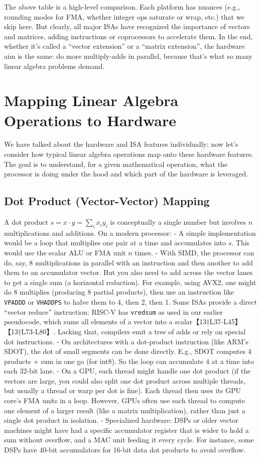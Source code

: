 The above table is a high-level comparison. Each platform has nuances (e.g., rounding modes for FMA, whether integer ops saturate or wrap, etc.) that we skip here. But clearly, all major ISAs have recognized the importance of vectors and matrices, adding instructions or coprocessors to accelerate them. In the end, whether it’s called a “vector extension” or a “matrix extension”, the hardware aim is the same: do more multiply-adds in parallel, because that’s what so many linear algebra problems demand.

\section{Mapping Linear Algebra Operations to Hardware}  
We have talked about the hardware and ISA features individually; now let’s consider how typical linear algebra operations map onto these hardware features. The goal is to understand, for a given mathematical operation, what the processor is doing under the hood and which part of the hardware is leveraged.

\subsection{Dot Product (Vector-Vector) Mapping}  
A dot product $s = x\cdot y = \sum_i x_i y_i$ is conceptually a single number but involves $n$ multiplications and additions. On a modern processor:
- A simple implementation would be a loop that multiplies one pair at a time and accumulates into $s$. This would use the scalar ALU or FMA unit $n$ times.
- With SIMD, the processor can do, say, 8 multiplications in parallel with an instruction and then another to add them to an accumulator vector. But you also need to add across the vector lanes to get a single sum (a horizontal reduction). For example, using AVX2, one might do 8 multiplies (producing 8 partial products), then use an instruction like \texttt{VPADDD} or \texttt{VHADDPS} to halve them to 4, then 2, then 1. Some ISAs provide a direct “vector reduce” instruction: RISC-V has \texttt{vredsum} as used in our earlier pseudocode, which sums all elements of a vector into a scalar【13†L37-L45】【13†L73-L80】. Lacking that, compilers emit a tree of adds or rely on special dot instructions.
- On architectures with a dot-product instruction (like ARM’s SDOT), the dot of small segments can be done directly. E.g., SDOT computes 4 products + sum in one go (for int8). So the loop can accumulate 4 at a time into each 32-bit lane.
- On a GPU, each thread might handle one dot product (if the vectors are large, you could also split one dot product across multiple threads, but usually a thread or warp per dot is fine). Each thread then uses its GPU core’s FMA units in a loop. However, GPUs often use each thread to compute one element of a larger result (like a matrix multiplication), rather than just a single dot product in isolation.
- Specialized hardware: DSPs or older vector machines might have had a specific accumulator register that is wider to hold a sum without overflow, and a MAC unit feeding it every cycle. For instance, some DSPs have 40-bit accumulators for 16-bit data dot products to avoid overflow.

